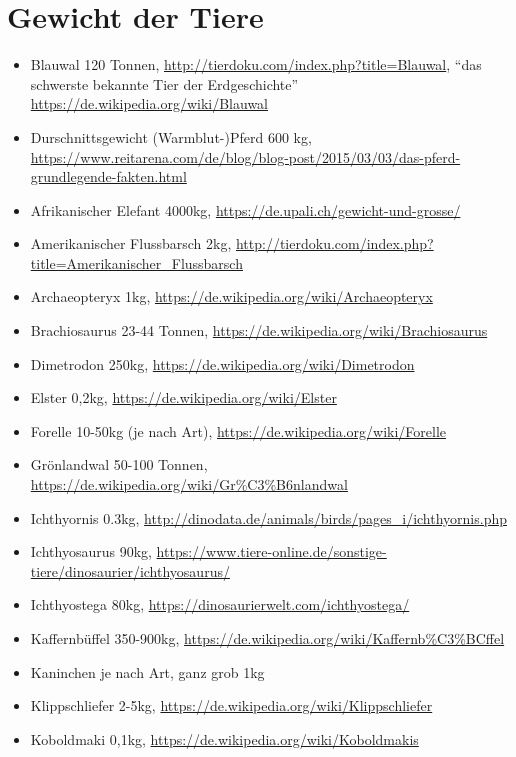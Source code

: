  
 \section{Gewicht der Tiere}
 \label{appendix_pca_weight}
 
 
 \begin{itemize}
  \item Blauwal 120 Tonnen, \url{http://tierdoku.com/index.php?title=Blauwal}, "`das schwerste bekannte Tier der Erdgeschichte"' \url{https://de.wikipedia.org/wiki/Blauwal}
  \item Durschnittsgewicht (Warmblut-)Pferd 600 kg, \url{https://www.reitarena.com/de/blog/blog-post/2015/03/03/das-pferd-grundlegende-fakten.html}
  \item Afrikanischer Elefant 4000kg, \url{https://de.upali.ch/gewicht-und-grosse/}
  \item Amerikanischer Flussbarsch 2kg, \url{http://tierdoku.com/index.php?title=Amerikanischer_Flussbarsch}
  \item Archaeopteryx 1kg, \url{https://de.wikipedia.org/wiki/Archaeopteryx}
  \item Brachiosaurus 23-44 Tonnen, \url{https://de.wikipedia.org/wiki/Brachiosaurus}
  \item Dimetrodon 250kg, \url{https://de.wikipedia.org/wiki/Dimetrodon}
  \item Elster 0,2kg, \url{https://de.wikipedia.org/wiki/Elster}
  \item Forelle 10-50kg (je nach Art), \url{https://de.wikipedia.org/wiki/Forelle}
  \item Grönlandwal 50-100 Tonnen, \url{https://de.wikipedia.org/wiki/Gr\%C3\%B6nlandwal}
  \item Ichthyornis 0.3kg, \url{http://dinodata.de/animals/birds/pages_i/ichthyornis.php}
  \item Ichthyosaurus 90kg, \url{https://www.tiere-online.de/sonstige-tiere/dinosaurier/ichthyosaurus/}
  \item Ichthyostega 80kg, \url{https://dinosaurierwelt.com/ichthyostega/}
  \item Kaffernbüffel 350-900kg, \url{https://de.wikipedia.org/wiki/Kaffernb\%C3\%BCffel}
  \item Kaninchen je nach Art, ganz grob 1kg
  \item Klippschliefer 2-5kg, \url{https://de.wikipedia.org/wiki/Klippschliefer}
  \item Koboldmaki 0,1kg, \url{https://de.wikipedia.org/wiki/Koboldmakis}

\end{itemize}
